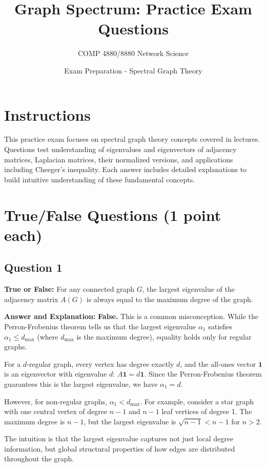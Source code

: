 \documentclass[11pt]{article}
\title{Graph Spectrum: Practice Exam Questions}
\author{COMP 4880/8880 Network Science}
\date{Exam Preparation - Spectral Graph Theory}
\newenvironment{answer}{\color{answercolor}\begin{framed}\textbf{Answer and Explanation:}}{\end{framed}}
\begin{document}
\maketitle

\section*{Instructions}
This practice exam focuses on spectral graph theory concepts covered in lectures. Questions test understanding of eigenvalues and eigenvectors of adjacency matrices, Laplacian matrices, their normalized versions, and applications including Cheeger's inequality. Each answer includes detailed explanations to build intuitive understanding of these fundamental concepts.

\section{True/False Questions (1 point each)}

\subsection{Question 1}
\textbf{True or False:} For any connected graph $G$, the largest eigenvalue of the adjacency matrix $A(G)$ is always equal to the maximum degree of the graph.

\begin{answer}
\textbf{False.} This is a common misconception. While the Perron-Frobenius theorem tells us that the largest eigenvalue $\alpha_1$ satisfies $\alpha_1 \leq d_{\max}$ (where $d_{\max}$ is the maximum degree), equality holds only for regular graphs.

For a $d$-regular graph, every vertex has degree exactly $d$, and the all-ones vector $\mathbf{1}$ is an eigenvector with eigenvalue $d$: $A\mathbf{1} = d\mathbf{1}$. Since the Perron-Frobenius theorem guarantees this is the largest eigenvalue, we have $\alpha_1 = d$.

However, for non-regular graphs, $\alpha_1 < d_{\max}$. For example, consider a star graph with one central vertex of degree $n-1$ and $n-1$ leaf vertices of degree 1. The maximum degree is $n-1$, but the largest eigenvalue is $\sqrt{n-1} < n-1$ for $n > 2$.

The intuition is that the largest eigenvalue captures not just local degree information, but global structural properties of how edges are distributed throughout the graph.
\end{answer}
\end{document}
